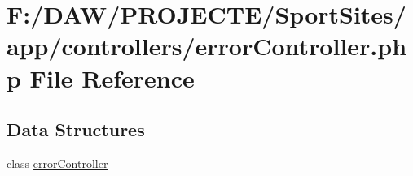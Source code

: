\hypertarget{error_controller_8php}{}\section{F\+:/\+D\+A\+W/\+P\+R\+O\+J\+E\+C\+T\+E/\+Sport\+Sites/app/controllers/error\+Controller.php File Reference}
\label{error_controller_8php}
\subsection*{Data Structures}
\begin{DoxyCompactItemize}
\item 
class \hyperlink{classerror_controller}{error\+Controller}
\end{DoxyCompactItemize}

